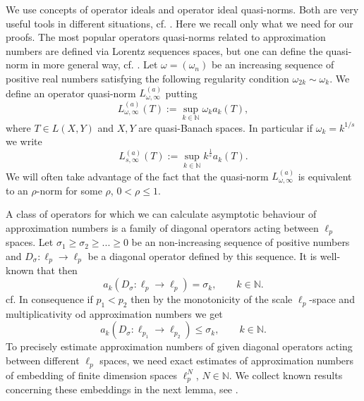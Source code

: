 \documentclass[12pt]{article}
\newcommand{\N}{{\mathbb N}}
\begin{document}
We use  concepts of operator ideals and operator ideal quasi-norms. Both  are  very useful tools in different situations, cf. \cite{Pi, Pi2}.   Here we recall only what we need for our proofs. The most popular operators quasi-norms related to  approximation numbers are  defined via  Lorentz sequences spaces, but one can define the quasi-norm  in  more general way, cf. \cite{Kuh3, KLSS1}.    Let  $\omega=(\omega_n)$ be an increasing sequence of positive real numbers satisfying the following regularity condition $\omega_{2k}\sim\omega_k$. We define an operator quasi-norm $L_{\omega,\infty}^{(a)}$ putting   
\begin{equation*}
	L_{\omega,\infty}^{(a)}(T):=\sup _{k\in\N}\omega_k a_k(T),	
\end{equation*}
where $T\in L(X,Y)$ and $X,Y$ are quasi-Banach spaces. 
In particular if $\omega_k=k^{1/s}$ we write  
\begin{equation}\label{Ls}
	L_{s,\infty}^{(a)}(T):=\sup _{k\in\N}k^{\frac{1}{s}} a_k(T).	
\end{equation}
We will often take advantage of the fact that the quasi-norm $L_{\omega,\infty}^{(a)}$ is equivalent to an $\rho$-norm for some $\rho$, $0<\rho \leq
1$.

A class of operators for which we can calculate asymptotic behaviour of approximation numbers is a family of diagonal operators acting between $\ell_p$ spaces. 
 Let $\sigma_1\geq\sigma_2\geq...\geq 0$ be an non-increasing sequence of positive numbers and $D_\sigma:\ell_{p}\rightarrow \ell_{p}$ be a diagonal operator defined by this sequence.  It is  well-known that then 
\[a_k(D_\sigma:\ell_{p}\rightarrow \ell_{p})=\sigma_k , \qquad k\in \N. \]
cf. \cite[Proposition 2.9.5]{Pi2}
In consequence if $p_1<p_2$ then by  the monotonicity of the scale $\ell_p$-space and multiplicativity od approximation numbers  we get
\begin{equation}
	\label{Dia}
	a_k(D_\sigma:\ell_{p_1}\rightarrow\ell_{p_2})\leq\sigma_k,  \qquad k\in \N.
\end{equation}
To precisely estimate   approximation numbers of given  diagonal operators acting between different $\ell_p$ spaces,  we need exact estimates of approximation numbers of embedding of finite dimension spaces $\ell^N_p$, $N\in\N$.  We collect known results concerning these embeddings in the next lemma,   see \cite{Cae,ET,Pi2}. 
\end{document}
